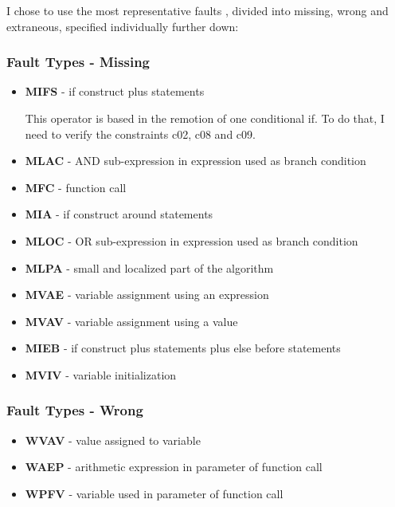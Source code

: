 I chose to use the most representative faults \cite{duraes2006emulation}, divided into missing, wrong and extraneous, specified individually further down:


\subsubsection{Fault Types - Missing}
\begin{itemize}
	\item \textbf{MIFS} - if construct plus statements

	This operator is based in the remotion of one conditional if. To do that, I need to verify the constraints c02, c08 and c09.
	\item \textbf{MLAC} - AND sub-expression in expression used as branch condition
	\item \textbf{MFC}  - function call
	\item \textbf{MIA}  - if construct around statements
	\item \textbf{MLOC} - OR sub-expression in expression used as branch condition
	\item \textbf{MLPA} - small and localized part of the algorithm
	\item \textbf{MVAE} - variable assignment using an expression
	\item \textbf{MVAV} - variable assignment using a value
	\item \textbf{MIEB} - if construct plus statements plus else before statements
	\item \textbf{MVIV} - variable initialization
\end{itemize}

\subsubsection{Fault Types - Wrong}
\begin{itemize}
	\item \textbf{WVAV} - value assigned to variable
	\item \textbf{WAEP} - arithmetic expression in parameter of function call
	\item \textbf{WPFV} - variable used in parameter of function call
\end{itemize}


